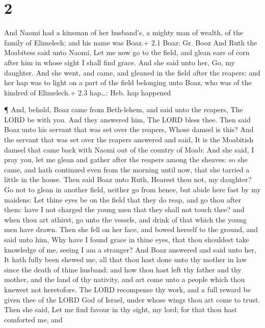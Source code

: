 \hypertarget{section-1}{%
\section{2}\label{section-1}}

 And Naomi had a kinsman of her husband's, a mighty man of
wealth, of the family of Elimelech; and his name was Boaz.+ 2.1 Boaz:
Gr. Booz  And Ruth the Moabitess said unto Naomi, Let me now
go to the field, and glean ears of corn after him in whose sight I shall
find grace. And she said unto her, Go, my daughter.  And she
went, and came, and gleaned in the field after the reapers: and her hap
was to light on a part of the field belonging unto Boaz, who was of the
kindred of Elimelech.+ 2.3 hap\ldots: Heb. hap happened

 ¶ And, behold, Boaz came from Beth-lehem, and said unto the
reapers, The LORD be with you. And they answered him, The LORD bless
thee.  Then said Boaz unto his servant that was set over the
reapers, Whose damsel is this?  And the servant that was set
over the reapers answered and said, It is the Moabitish damsel that came
back with Naomi out of the country of Moab:  And she said, I
pray you, let me glean and gather after the reapers among the sheaves:
so she came, and hath continued even from the morning until now, that
she tarried a little in the house.  Then said Boaz unto
Ruth, Hearest thou not, my daughter? Go not to glean in another field,
neither go from hence, but abide here fast by my maidens: 
Let thine eyes be on the field that they do reap, and go thou after
them: have I not charged the young men that they shall not touch thee?
and when thou art athirst, go unto the vessels, and drink of that which
the young men have drawn.  Then she fell on her face, and
bowed herself to the ground, and said unto him, Why have I found grace
in thine eyes, that thou shouldest take knowledge of me, seeing I am a
stranger?  And Boaz answered and said unto her, It hath
fully been shewed me, all that thou hast done unto thy mother in law
since the death of thine husband: and how thou hast left thy father and
thy mother, and the land of thy nativity, and art come unto a people
which thou knewest not heretofore.  The LORD recompense thy
work, and a full reward be given thee of the LORD God of Israel, under
whose wings thou art come to trust.  Then she said, Let me
find favour in thy sight, my lord; for that thou hast comforted me, and
